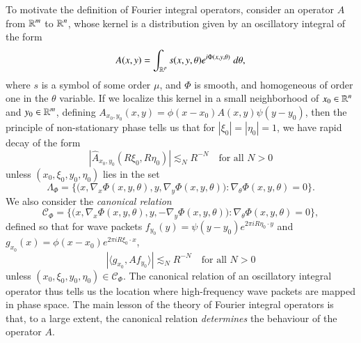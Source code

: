 To motivate the definition of Fourier integral operators, consider an operator $A$ from $\operatorname{\mathbb{R}}^m$ to $\operatorname{\mathbb{R}}^n$, whose kernel is a distribution given by an oscillatory integral of the form
%
\[ A(x,y) = \int_{\operatorname{\mathbb{R}}^p} s(x,y,\theta) e^{i \Phi(x,y,\theta)}\; d\theta, \]
%
where $s$ is a symbol of some order $\mu$, and $\Phi$ is smooth, and homogeneous of order one in the $\theta$ variable. If we localize this kernel in a small neighborhood of $x_0 \in \operatorname{\mathbb{R}}^n$ and $y_0 \in \operatorname{\mathbb{R}}^m$, defining $A_{x_0,y_0}(x,y) = \phi(x - x_0) A(x,y) \psi(y - y_0)$, then the principle of non-stationary phase tells us that for $|\xi_0| = |\eta_0| = 1$, we have rapid decay of the form
%
\[ |\widehat{A}_{x_0,y_0}(R\xi_0,R\eta_0)| \lesssim_N R^{-N}\quad \text{for all $N > 0$} \]
%
unless $(x_0,\xi_0,y_0,\eta_0)$ lies in the set
%
\[ \Lambda_\Phi = \Big\{ \big(x, \nabla_x \Phi(x,y,\theta) ,y, \nabla_y \Phi(x,y,\theta) \big) : \nabla_\theta \Phi(x,y,\theta) = 0 \Big\}. \]
%
We also consider the \emph{canonical relation}
%
\[ \mathcal{C}_\Phi = \Big\{ \big(x, \nabla_x \Phi(x,y,\theta) ,y, -\nabla_y \Phi(x,y,\theta) \big) : \nabla_\theta \Phi(x,y,\theta) = 0 \Big\}, \]
%
defined so that for wave packets $f_{y_0}(y) = \psi(y - y_0) e^{2 \pi i R \eta_0 \cdot y}$ and $g_{x_0}(x) = \phi(x - x_0) e^{2 \pi i R \xi_0 \cdot x}$,
%
\[ |\langle g_{x_0}, Af_{y_0} \rangle| \lesssim_N R^{-N}\quad \text{for all $N > 0$} \]
%
unless $(x_0,\xi_0,y_0,\eta_0) \in \mathcal{C}_\Phi$. The canonical relation of an oscillatory integral operator thus tells us the location where high-frequency wave packets are mapped in phase space. The main lesson of the theory of Fourier integral operators is that, to a large extent, the canonical relation \emph{determines} the behaviour of the operator $A$.

